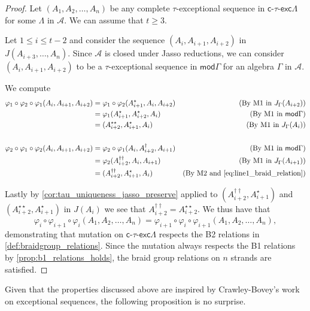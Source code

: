 \documentclass[11pt]{amsart}
\newcommand{\mods}{\mathsf{mod}}
\newcommand{\ctauexc}[1]{\ensuremath{\mathsf{c}\text{-}\tau\text{-}\mathsf{exc} #1}}
\theoremstyle{definition}
\begin{document}
\begin{proof}
    Let $(A_1,A_2,\dots,A_n)$ be any complete $\tau$-exceptional sequence in $\ctauexc{\Lambda}$ for some $\Lambda$ in $\mathcal{A}$. We can assume that $t\geq 3$.

    Let $1 \leq i \leq t-2$ and consider the sequence $(A_i,A_{i+1},A_{i+2})$ in $J(A_{i+3},\dots,A_n)$. Since $\mathcal{A}$ is closed under Jasso reductions, we can consider $(A_i,A_{i+1},A_{i+2})$ to be a $\tau$-exceptional sequence in $\mods \Gamma$ for an algebra $\Gamma$ in $\mathcal{A}$. 

    We compute \begin{align}
        \varphi_1\circ \varphi_2 \circ \varphi_1(A_i,A_{i+1},A_{i+2}) &= \varphi_1 \circ \varphi_2(A^\star_{i+1},A_i,A_{i+2}) & \text{(By M1 in $J_\Gamma(A_{i+2})$)} \label{eq:line1_braid_relation}\\
        &= \varphi_1(A^\star_{i+1},A^\star_{i+2},A_i) & \text{(By M1 in $\mods \Gamma$)}\\
        &= (A^{\star\star}_{i+2},A^\star_{i+1},A_i) & \text{(By M1 in $J_\Gamma(A_{i})$)} \\ \notag \\
        \varphi_2\circ \varphi_1 \circ \varphi_2(A_i,A_{i+1},A_{i+2}) &= \varphi_2 \circ \varphi_1(A_{i},A^\dagger_{i+2},A_{i+1}) & \text{(By M1 in $\mods \Gamma$)}\\
        &= \varphi_2(A^{\dagger\dagger}_{i+2},A_{i},A_{i+1}) & \text{(By M1 in $J_\Gamma(A_{i+1})$)}\\
        &= (A^{\dagger\dagger}_{i+2},A^\star_{i+1},A_i) & \text{(By M2 and \cref{eq:line1_braid_relation})}
    \end{align} 


    
    Lastly by \cref{cor:tau_uniqueness_jasso_preserve} applied to $(A^{\dagger\dagger}_{i+2},A^\star_{i+1})$ and $(A^{\star\star}_{i+2},A^\star_{i+1})$ in $J(A_i)$ we see that $A^{\dagger\dagger}_{i+2} = A^{\star\star}_{i+2}$. We thus have that \[\varphi_i\circ \varphi_{i+1} \circ \varphi_i(A_1,A_2,\dots,A_n) = \varphi_{i+1} \circ \varphi_i \circ \varphi_{i+1}(A_1,A_2,\dots,A_n),\] demonstrating that mutation on $\ctauexc{\Lambda}$ respects the B2 relations in \cref{def:braidgroup_relations}. Since the mutation always respects the B1 relations by \cref{prop:b1_relations_holds}, the braid group relations on $n$ strands are satisfied.
\end{proof}

Given that the properties discussed above are inspired by Crawley-Bovey's work on exceptional sequences, the following proposition is no surprise.
\end{document}
